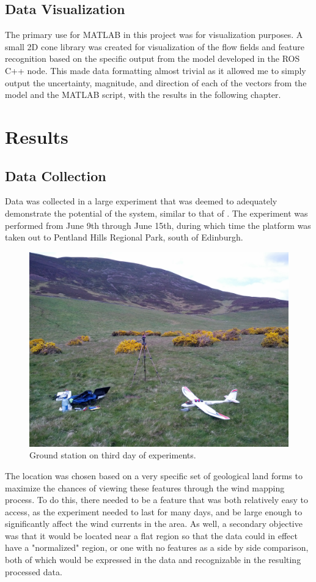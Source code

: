 \documentclass[12pt]{report}
\begin{document}
\section{Data Visualization}
The primary use for MATLAB in this project was for visualization purposes. A small 2D cone library was created for visualization of the flow fields and feature recognition based on the specific output from the model developed in the ROS C++ node. This made data formatting almost trivial as it allowed me to simply output the uncertainty, magnitude, and direction of each of the vectors from the model and the MATLAB script, with the results in the following chapter.

\chapter{Results} 

\section{Data Collection}

Data was collected in a large experiment that was deemed to adequately demonstrate the potential of the system, similar to that of \cite{Leonard10}. The experiment was performed from June 9th through June 15th, during which time the platform was taken out to Pentland Hills Regional Park, south of Edinburgh.
\begin{figure}[!ht]
	\centering
    \includegraphics[scale=0.15]{in_field_picture.jpg}  
    \caption{Ground station on third day of experiments.}
    \label{fig:in_field}
\end{figure}
The location was chosen based on a very specific set of geological land forms to maximize the chances of viewing these features through the wind mapping process. To do this, there needed to be a feature that was both relatively easy to access, as the experiment needed to last for many days, and be large enough to significantly affect the wind currents in the area. As well, a secondary objective was that it would be located near a flat region so that the data could in effect have a "normalized" region, or one with no features as a side by side comparison, both of which would be expressed in the data and recognizable in the resulting processed data.
\end{document}
